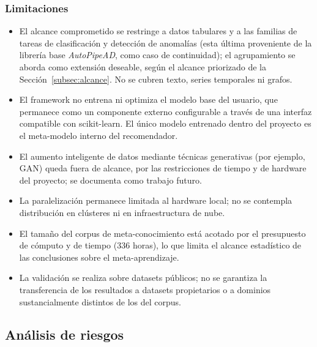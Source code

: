 \documentclass[12pt,letterpaper]{article}
\begin{document}
\subsubsection{Limitaciones}

\begin{itemize}
  \item El alcance comprometido se restringe a datos tabulares y a las familias de tareas de clasificación y detección de anomalías (esta última proveniente de la librería base \textit{AutoPipeAD}, como caso de continuidad); el agrupamiento se aborda como extensión deseable, según el alcance priorizado de la Sección~\ref{subsec:alcance}. No se cubren texto, series temporales ni grafos.
  \item El framework no entrena ni optimiza el modelo base del usuario, que permanece como un componente externo configurable a través de una interfaz compatible con scikit-learn. El único modelo entrenado dentro del proyecto es el meta-modelo interno del recomendador.
  \item El aumento inteligente de datos mediante técnicas generativas (por ejemplo, GAN) queda fuera de alcance, por las restricciones de tiempo y de hardware del proyecto; se documenta como trabajo futuro.
  \item La paralelización permanece limitada al hardware local; no se contempla distribución en clústeres ni en infraestructura de nube.
  \item El tamaño del corpus de meta-conocimiento está acotado por el presupuesto de cómputo y de tiempo (336 horas), lo que limita el alcance estadístico de las conclusiones sobre el meta-aprendizaje.
  \item La validación se realiza sobre datasets públicos; no se garantiza la transferencia de los resultados a datasets propietarios o a dominios sustancialmente distintos de los del corpus.
\end{itemize}

\newpage
\subsection{Análisis de riesgos}
\end{document}
